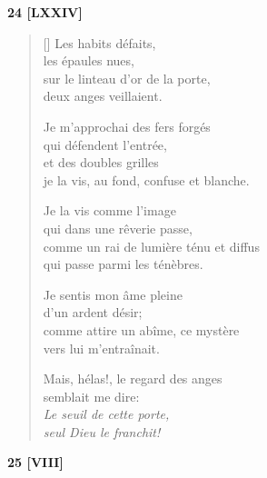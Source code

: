\documentclass[a4paper,12pt]{book}
\begin{document}
\bigskip

\begin{center}
  \textbf{24 [LXXIV]}
\end{center}

\settowidth{\versewidth}{je la vis, au fond, confuse et blanche.}

\begin{verse}[\versewidth]
  Les habits défaits, \\
  les épaules nues, \\
  sur le linteau d'or de la porte, \\
  deux anges veillaient.

  Je m'approchai des fers forgés \\
  qui défendent l'entrée, \\
  et des doubles grilles \\
  je la vis, au fond, confuse et blanche.

  Je la vis comme l'image \\
  qui dans une rêverie passe, \\
  comme un rai de lumière ténu et diffus \\
  qui passe parmi les ténèbres.

  Je sentis mon âme pleine \\
  d'un ardent désir; \\
  comme attire un abîme, ce mystère \\
  vers lui m'entraînait.

  Mais, hélas!, le regard des anges \\
  semblait me dire: \\
  \emph{Le seuil de cette porte, \\
  seul Dieu le franchit!}
\end{verse}

\bigskip

\begin{center}
  \textbf{25 [VIII]}
\end{center}

\settowidth{\versewidth}{et m'inonder de leur lumière, et avec elles}
\end{document}
